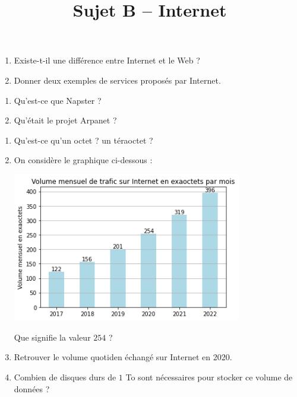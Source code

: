 \documentclass[a4paper]{article}
\begin{document}
\title{Sujet B -- Internet}

\pagestyle{empty}

\date{}
\author{}

\maketitle{}
\thispagestyle{empty}

\exo[2 points]\vspace*{-2mm}
\begin{enumerate}
  \item Existe-t-il une différence entre Internet et le Web ?
  \item Donner deux exemples de services proposés par Internet.
\end{enumerate}

\bigskip

\exo[3 points]\vspace*{-2mm}
\begin{enumerate}
  \item Qu'est-ce que Napster ?
  \item Qu'était le projet Arpanet ?
\end{enumerate}

\bigskip

\exo[6 points]\vspace*{-2mm}
\begin{enumerate}
  \item Qu'est-ce qu'un octet ? un téraoctet ?
  \item On considère le graphique ci-dessous : 
   \begin{center}
     \includegraphics[width=10cm]{volume.png}
   \end{center} 
   Que signifie la valeur $254$ ?
  \item Retrouver le volume quotiden échangé sur Internet en 2020.
  \item Combien de disques durs de $1$ To sont nécessaires pour stocker ce volume de données ?
\end{enumerate}
\end{document}
